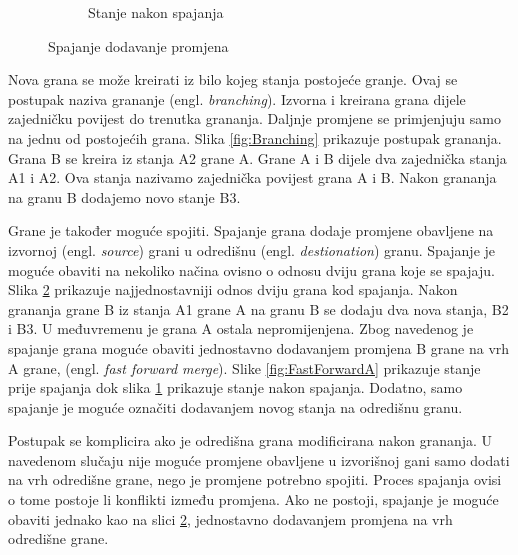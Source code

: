 \documentclass[times, utf8, diplomski, numeric]{fer}
\newcommand{\eng}[1]{(engl. \textit{#1})}
\begin{document}
\begin{figure}
\begin{subfigure}{.49\textwidth}
\caption{Stanje nakon spajanja}
\label{fig:FastForwardB}
\end{subfigure}
\caption{Spajanje dodavanje promjena}
\label{fig:FastForward}
\end{figure}

Nova grana se može kreirati iz bilo kojeg stanja postojeće granje. Ovaj se postupak naziva grananje \eng{branching}. Izvorna i kreirana grana dijele zajedničku povijest do trenutka grananja. Daljnje promjene se primjenjuju samo na jednu od postojećih grana. Slika \ref{fig:Branching} prikazuje postupak grananja. Grana B se kreira iz stanja A2 grane A. Grane A i B dijele dva zajednička stanja A1 i A2. Ova stanja nazivamo zajednička povijest grana A i B. Nakon grananja na granu B dodajemo novo stanje B3.

Grane je također moguće spojiti. Spajanje grana dodaje promjene obavljene na izvornoj \eng{source} grani u odredišnu \eng{destionation} granu. Spajanje je moguće obaviti na nekoliko načina ovisno o odnosu dviju grana koje se spajaju. Slika \ref{fig:FastForward} prikazuje najjednostavniji odnos dviju grana kod spajanja. Nakon grananja grane B iz stanja A1 grane A na granu B se dodaju dva nova stanja, B2 i B3. U međuvremenu je grana A ostala nepromijenjena. Zbog navedenog je spajanje grana moguće obaviti jednostavno dodavanjem promjena B grane na vrh A grane, \eng{fast forward merge}. Slike \ref{fig:FastForwardA} prikazuje stanje prije spajanja dok slika \ref{fig:FastForwardB} prikazuje stanje nakon spajanja. Dodatno, samo spajanje je moguće označiti dodavanjem novog stanja na odredišnu granu.

Postupak se komplicira ako je odredišna grana modificirana nakon grananja. U navedenom slučaju nije moguće promjene obavljene u izvorišnoj gani samo dodati na vrh odredišne grane, nego je promjene potrebno spojiti. Proces spajanja ovisi o tome postoje li konflikti između promjena. Ako ne postoji, spajanje je moguće obaviti jednako kao na slici \ref{fig:FastForward}, jednostavno dodavanjem promjena na vrh odredišne grane.
\end{document}
